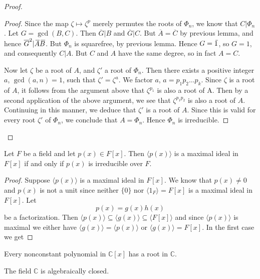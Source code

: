 \begin{proof}
\begin{proof}
        Since the map $\zeta \mapsto \zeta^p$ merely permutes the roots of
        $\Phi_n$, we know that $C|\Phi_n$. Let $G = \gcd(B,C)$. Then $\overline{G}|B$ and $\overline{G}|C$. But $\overline{A} = \overline{C}$ by previous lemma,
        and hence $\overline{G}^2 | \,\overline{\!{A}} \,\overline{\!{B}}$. But $\Phi_n$ is squarefree, by previous lemma. Hence $G = \,\overline{\!{1}}$, so $G = 1$,
        and consequently $C |A$. But $C$ and $A$ have the same degree, so in fact $A = C$.
        
        Now let $\zeta$ be a root of $A$, and $\zeta'$ a root of $\Phi_n$. Then there exists a positive integer $a$,
        $\gcd(a, n) = 1$, such that $\zeta' = \zeta^a$. We factor $a$, $a = p_1p_2 \ldots p_k$. Since $\zeta$ is a root of $A$, it follows
        from the argument above that $\zeta^{p_1}$ is also a root of A. Then by a second application of
        the above argument, we see that $\zeta^{p_1p_2}$ is also a root of $A$. Continuing in this manner, we
        deduce that $\zeta'$ is a root of $A$. Since this is valid for every root $\zeta'$ of $\Phi_n$, we conclude that
        $A = \Phi_n$. Hence $\Phi_n$ is irreducible.
    \end{proof}
\end{proof}



\begin{theorem}
    Let $F$ be a field and let $p(x) \in F[x]$. Then $\langle p(x) \rangle$ is a maximal ideal in $F[x]$
    if and only if $p(x)$ is irreducible over $F$.
\end{theorem}
\begin{proof}
    Suppose $\langle p(x) \rangle$ is a maximal ideal in $F[x]$. We know that $p(x) \neq 0$ and 
    $p(x)$ is not a unit since neither $\{ 0 \}$ nor $\langle 1_F \rangle = F[x]$ is a 
    maximal ideal in $F[x]$. Let 
    \[
        p(x) = g(x) h(x)
    \]
    be a factorization. Then $\langle p(x) \rangle \subseteq \langle g(x) \rangle 
    \subseteq \langle F[x] \rangle$ and since $\langle p(x) \rangle$ is maximal we either have 
    $\langle g(x) \rangle = \langle p(x) \rangle$ or $\langle g(x) \rangle = F[x]$. In the 
    first case we get 
\end{proof}

\begin{theorem}
    Every nonconstant polynomial in $\mathbb{C}[x]$ has a root in $\mathbb{C}$.
\end{theorem}
\begin{remark}
    The field $\mathbb{C}$ is algebraically closed.
\end{remark}

